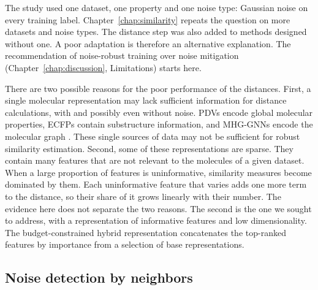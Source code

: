 The study used one dataset, one property and one noise type: Gaussian noise on every training label. Chapter~\ref{chap:similarity} repeats the question on more datasets and noise types. The distance step was also added to methods designed without one. A poor adaptation is therefore an alternative explanation. The recommendation of noise-robust training over noise mitigation (Chapter~\ref{chap:discussion}, Limitations) starts here.

There are two possible reasons for the poor performance of the distances. First, a single molecular representation may lack sufficient information for distance calculations, with and possibly even without noise. PDVs encode global molecular properties, ECFPs contain substructure information, and MHG-GNNs encode the molecular graph \citep{kishimoto2023}. These single sources of data may not be sufficient for robust similarity estimation. Second, some of these representations are sparse. They contain many features that are not relevant to the molecules of a given dataset. When a large proportion of features is uninformative, similarity measures become dominated by them. Each uninformative feature that varies adds one more term to the distance, so their share of it grows linearly with their number. The evidence here does not separate the two reasons. The second is the one we sought to address, with a representation of informative features and low dimensionality. The budget-constrained hybrid representation concatenates the top-ranked features by importance from a selection of base representations.


\subsection{Noise detection by neighbors}\label{sec:flaws:neighbors} %

